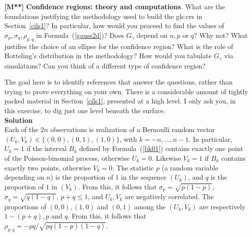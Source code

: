 \documentclass[10pt]{article}
\begin{document}
\begin{Exercise}\label{exhotelling}{\bf [M**]} 
{\bf Confidence regions: theory and computations}.  What are the foundations justifying the methodology used to build the 
\glspl{gls:cr} 
in Section~\ref{cils1}? In particular, how would you proceed to find the values of $\sigma_p,\sigma_q,\rho_{p,q}$ in Formula~(\ref{gauss2d})? Does $G_\gamma$ depend 
on $n, p$ or $q$? Why not? What justifies the choice of an ellipse for the confidence region? What is the role of 
\textcolor{index}{Hotteling's distribution} in the methodology? How would you tabulate $G_\gamma$ via 
simulations? Can you think of a different type of confidence region? 

The goal here is to identify references that answer the questions, rather than trying to prove everything on your own. There is a considerable amount of tightly packed material in Section~\ref{cils1}, presented at a high level. I only ask you, in this exercise, to dig  just one level beneath the surface. \vspace{1ex} \\
{\bf Solution} \vspace{1ex} \\
Each of the $2n$ observations is  realization of a Bernoulli random vector  
$(U_k, V_k)\in \{(0,0), (0,1), (1,0)\}$, with $k=-n,\dots,n-1$.  In particular, $U_k=1$ if the interval $B_k$ defined by Formula~(\ref{bk01}) contains exactly one point of the Poisson-binomial process, otherwise $U_k=0$. 
Likewise $V_k=1$ if $B_k$ contains exactly two points, otherwise $V_k=0$. The statistic $p$ (a random variable depending on $n$) is the proportion of $1$ in the sequence $(U_k)$, and $q$ is the proportion
of $1$ in $(V_k)$. From this, it follows that $\sigma_p=\sqrt{p(1-p)}$, $\sigma_q=\sqrt{q(1-q)}$, $p+q\leq 1$, and $U_k,V_k$ are negatively correlated. The proportions of $(0,0), (1,0)$ 
and $(0,1)$ among the $(U_k,V_k)$ are respectively 
$1-(p+q), p$ and $q$. From this, it follows that $\rho_{p,q}=-pq/\sqrt{pq(1-p)(1-q)}$.


\end{Exercise}
\end{document}
